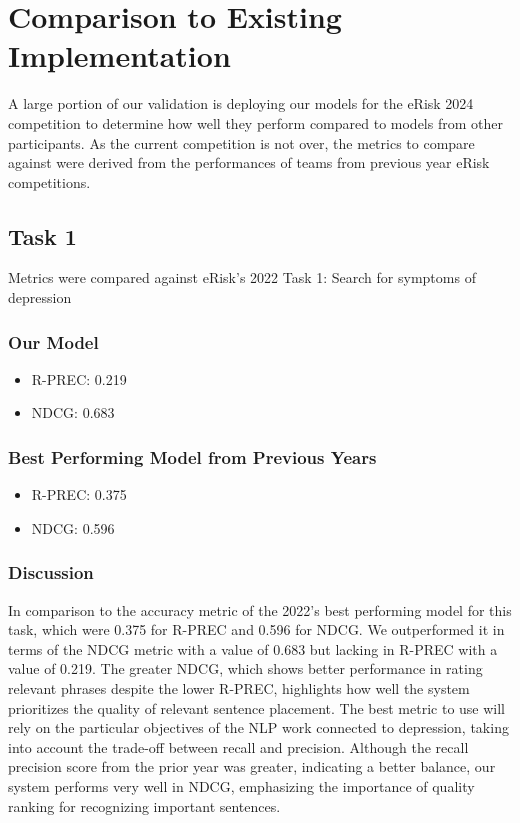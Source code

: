 \documentclass[12pt, titlepage]{article}
\begin{document}
	
\section{Comparison to Existing Implementation}	

A large portion of our validation is deploying our models for the eRisk 2024 competition to determine how well they perform compared to models from other participants. As the current competition is not over, the metrics to compare against were derived from the performances of teams from previous year eRisk competitions.

\subsection{Task 1}
Metrics were compared against eRisk's 2022 Task 1: Search for symptoms of depression

\subsubsection{Our Model}
\begin{itemize}
\item R-PREC: 0.219
\item NDCG: 0.683
\end{itemize}

\subsubsection{Best Performing Model from Previous Years}
\begin{itemize}
\item R-PREC: 0.375
\item NDCG: 0.596
\end{itemize}

\subsubsection{Discussion}
In comparison to the accuracy metric of the 2022's best performing model for this task, which were 0.375 for R-PREC and 0.596 for NDCG. We outperformed it in terms of the NDCG metric with a value of 0.683 but lacking in R-PREC with a value of 0.219. The greater NDCG, which shows better performance in rating relevant phrases despite the lower R-PREC, highlights how well the system prioritizes the quality of relevant sentence placement. The best metric to use will rely on the particular objectives of the NLP work connected to depression, taking into account the trade-off between recall and precision. Although the recall precision score from the prior year was greater, indicating a better balance, our system performs very well in NDCG, emphasizing the importance of quality ranking for recognizing important sentences.
\end{document}
